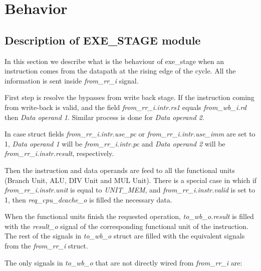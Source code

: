 \section{Behavior}

\subsection{Description of EXE\_STAGE module}

In this section we describe what is the behaviour of exe\_stage when an instruction comes from the datapath at the rising edge of the cycle. All the information is sent inside \emph{from\_rr\_i} signal. 

First step is resolve the bypasses from write back stage. If the instruction coming from write-back is valid, and the field \emph{from\_rr\_i.intr.rs1} equals \emph{from\_wb\_i.rd} then \emph{Data operand 1}. Similar process is done for \emph{Data operand 2}.

In case struct fields \emph{from\_rr\_i.intr.use\_pc} or \emph{from\_rr\_i.intr.use\_imm} are set to 1, \emph{Data operand 1} will be \emph{from\_rr\_i.intr.pc} and \emph{Data operand 2} will be \emph{from\_rr\_i.instr.result}, respectively.

Then the instruction and data operands are feed to all the functional units (Branch Unit, ALU, DIV Unit and MUL Unit). There is a special case in which if \emph{from\_rr\_i.instr.unit} is equal to \emph{UNIT\_MEM}, and \emph{from\_rr\_i.instr.valid} is set to 1, then \emph{req\_cpu\_dcache\_o} is filled the necessary data.

When the functional units finish the requested operation, \emph{to\_wb\_o.result} is filled with the \emph{result\_o} signal of the corresponding functional unit of the instruction. The rest of the signals in \emph{to\_wb\_o} struct are filled with the equivalent signals from the \emph{from\_rr\_i} struct.

The only signals in \emph{to\_wb\_o} that are not directly wired from \emph{from\_rr\_i} are:

